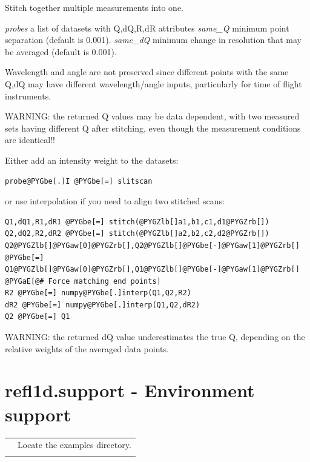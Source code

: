 \documentclass[letterpaper,10pt,english]{sphinxmanual}
\begin{document}
\begin{fulllineitems}
\label{api/stitch:refl1d.stitch.stitch}
Stitch together multiple measurements into one.

\emph{probes} a list of datasets with Q,dQ,R,dR attributes
\emph{same\_Q} minimum point separation (default is 0.001).
\emph{same\_dQ} minimum change in resolution that may be averaged (default is 0.001).

Wavelength and angle are not preserved since different points with the
same Q,dQ may have different wavelength/angle inputs, particularly for
time of flight instruments.

WARNING: the returned Q values may be data dependent, with two measured
sets having different Q after stitching, even though the measurement
conditions are identical!!

Either add an intensity weight to the datasets:

\begin{Verbatim}[commandchars=@\[\]]
probe@PYGbe[.]I @PYGbe[=] slitscan
\end{Verbatim}

or use interpolation if you need to align two stitched scans:

\begin{Verbatim}[commandchars=@\[\]]
Q1,dQ1,R1,dR1 @PYGbe[=] stitch(@PYGZlb[]a1,b1,c1,d1@PYGZrb[])
Q2,dQ2,R2,dR2 @PYGbe[=] stitch(@PYGZlb[]a2,b2,c2,d2@PYGZrb[])
Q2@PYGZlb[]@PYGaw[0]@PYGZrb[],Q2@PYGZlb[]@PYGbe[-]@PYGaw[1]@PYGZrb[] @PYGbe[=] Q1@PYGZlb[]@PYGaw[0]@PYGZrb[],Q1@PYGZlb[]@PYGbe[-]@PYGaw[1]@PYGZrb[] @PYGaE[@# Force matching end points]
R2 @PYGbe[=] numpy@PYGbe[.]interp(Q1,Q2,R2)
dR2 @PYGbe[=] numpy@PYGbe[.]interp(Q1,Q2,dR2)
Q2 @PYGbe[=] Q1
\end{Verbatim}

WARNING: the returned dQ value underestimates the true Q, depending on
the relative weights of the averaged data points.

\end{fulllineitems}



\section{refl1d.support - Environment support}
\label{api/support:refl1d-support-environment-support}\label{api/support::doc}
\begin{tabulary}{\linewidth}{LL}
\hline

{\hyperref[api/support:refl1d.support.get_data_path]{}}
 & 
Locate the examples directory.
\\

{\hyperref[api/support:refl1d.support.sample_data]{}}
 & 

\\
\hline
\end{tabulary}
\end{document}
